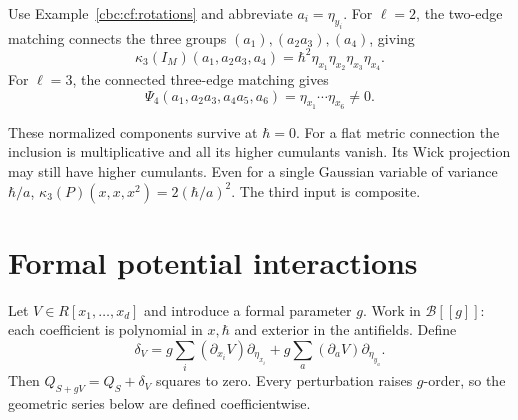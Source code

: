 \begin{example}\label{cbc:cf:composite}
Use Example~\ref{cbc:cf:rotations} and abbreviate
$a_i=\eta_{y_i}$. For $\ell=2$, the two-edge matching
connects the three groups $(a_1),(a_2a_3),(a_4)$, giving
\[
 \kappa_3(I_M)(a_1,a_2a_3,a_4)
        =\hbar^2\eta_{x_1}\eta_{x_2}\eta_{x_3}\eta_{x_4}.
\]
For $\ell=3$, the connected three-edge matching gives
\[
 \Psi_4(a_1,a_2a_3,a_4a_5,a_6)
        =\eta_{x_1}\cdots\eta_{x_6}\ne0.
\]

These normalized components survive at $\hbar=0$.
For a flat metric connection the inclusion is multiplicative
and all its higher cumulants vanish. Its Wick projection may
still have higher cumulants. Even for a single Gaussian variable
of variance $\hbar/a$,
$\kappa_3(P)(x,x,x^2)=2(\hbar/a)^2$.
The third input is composite.
\end{example}

\section{Formal potential interactions}
\label{cbc:cf:interactions}

Let $V\in R[x_1,\ldots,x_d]$ and introduce a formal parameter
$g$. Work in $\mathcal B[[g]]$: each coefficient is polynomial
in $x,\hbar$ and exterior in the antifields. Define
\[
 \delta_V=g\sum_i(\partial_{x_i}V)\partial_{\eta_{x_i}}
          +g\sum_a(\partial_aV)\partial_{\eta_{y_a}}.
\]
Then $Q_{S+gV}=Q_S+\delta_V$ squares to zero.
Every perturbation raises $g$-order, so the geometric series
below are defined coefficientwise.

